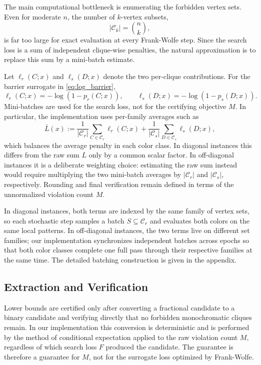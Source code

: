 \documentclass{article}
\begin{document}
The main computational bottleneck is enumerating the forbidden vertex sets. Even for moderate $n$, the number of $k$-vertex subsets,
\[
|\mathcal{C}_k| = \binom{n}{k},
\]
is far too large for exact evaluation at every Frank-Wolfe step. Since the search loss is a sum of independent clique-wise penalties, the natural approximation is to replace this sum by a mini-batch estimate.

Let $\ell_r(C;x)$ and $\ell_s(D;x)$ denote the two per-clique contributions. For the barrier surrogate in \cref{eq:log_barrier},
\[
\ell_r(C;x) = -\log\left(1 - p_r(C;x)\right),
\qquad
\ell_s(D;x) = -\log\left(1 - p_s(D;x)\right).
\]
Mini-batches are used for the search loss, not for the certifying objective $M$. In particular, the implementation uses per-family averages such as
\[
\bar{L}(x)
:=
\frac{1}{|\mathcal{C}_r|}\sum_{C \in \mathcal{C}_r} \ell_r(C;x)
+
\frac{1}{|\mathcal{C}_s|}\sum_{D \in \mathcal{C}_s} \ell_s(D;x),
\]
which balances the average penalty in each color class. In diagonal instances this differs from the raw sum $L$ only by a common scalar factor. In off-diagonal instances it is a deliberate weighting choice: estimating the raw sum instead would require multiplying the two mini-batch averages by $|\mathcal{C}_r|$ and $|\mathcal{C}_s|$, respectively. Rounding and final verification remain defined in terms of the unnormalized violation count $M$.

In diagonal instances, both terms are indexed by the same family of vertex sets, so each stochastic step samples a batch $S\subseteq \mathcal{C}_r$ and evaluates both colors on the same local patterns. In off-diagonal instances, the two terms live on different set families; our implementation synchronizes independent batches across epochs so that both color classes complete one full pass through their respective families at the same time. The detailed batching construction is given in the appendix.

\subsection{Extraction and Verification}\label{sec:extraction}

Lower bounds are certified only after converting a fractional candidate to a binary candidate and verifying directly that no forbidden monochromatic cliques remain. In our implementation this conversion is deterministic and is performed by the method of conditional expectation applied to the raw violation count $M$, regardless of which search loss $F$ produced the candidate. The guarantee is therefore a guarantee for $M$, not for the surrogate loss optimized by Frank-Wolfe.
\end{document}
